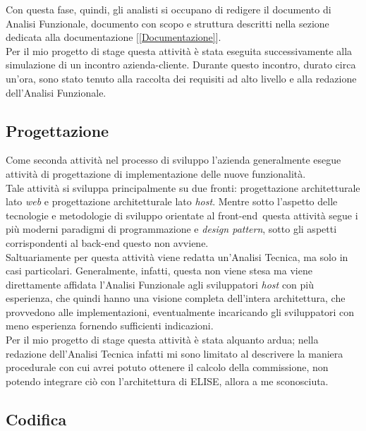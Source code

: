 	Con questa fase, quindi, gli analisti si occupano di redigere il documento di Analisi Funzionale, documento con scopo e struttura descritti nella sezione dedicata alla documentazione [\ref{Documentazione}].\\

	Per il mio progetto di stage questa attività è stata eseguita successivamente alla simulazione di un incontro azienda-cliente. Durante questo incontro, durato circa un'ora, sono stato tenuto alla raccolta dei requisiti ad alto livello e alla redazione dell'Analisi Funzionale.	

\subsection{Progettazione}

	Come seconda attività nel processo di sviluppo l'azienda generalmente esegue attività di progettazione di implementazione delle nuove funzionalità.\\

	Tale attività si sviluppa principalmente su due fronti: progettazione architetturale lato \textit{web} e progettazione architetturale lato \textit{host}. Mentre sotto l'aspetto delle tecnologie e metodologie di sviluppo orientate al front-end\glossario\ questa attività segue i più moderni paradigmi di programmazione e \textit{design pattern}, sotto gli aspetti corrispondenti al back-end questo non avviene.\\
	
	Saltuariamente per questa attività viene redatta un'Analisi Tecnica, ma solo in casi particolari. Generalmente, infatti, questa non viene stesa ma viene direttamente affidata l'Analisi Funzionale agli sviluppatori \textit{host} con più esperienza, che quindi hanno una visione completa dell'intera architettura, che provvedono alle implementazioni, eventualmente incaricando gli sviluppatori con meno esperienza fornendo sufficienti indicazioni.\\

	Per il mio progetto di stage questa attività è stata alquanto ardua; nella redazione dell'Analisi Tecnica infatti mi sono limitato al descrivere la maniera procedurale con cui avrei potuto ottenere il calcolo della commissione, non potendo integrare ciò con l'architettura di ELISE, allora a me sconosciuta.
	 	
\subsection{Codifica}
	
